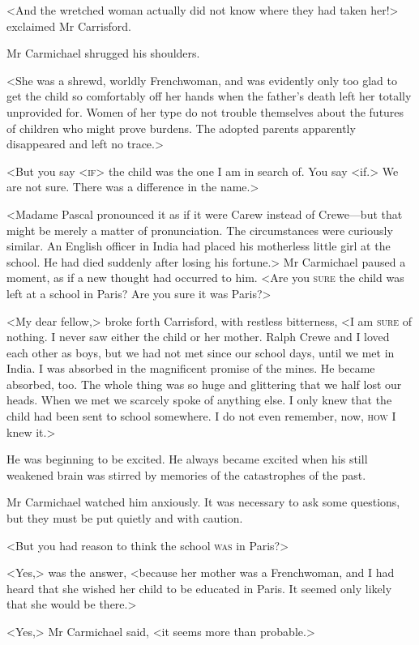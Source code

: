 <And the wretched woman actually did not know where they had taken her!> exclaimed Mr Carrisford.

Mr Carmichael shrugged his shoulders.

<She was a shrewd, worldly Frenchwoman, and was evidently only too glad to get the child so comfortably off her hands when the father's death left her totally unprovided for. Women of her type do not trouble themselves about the futures of children who might prove burdens. The adopted parents apparently disappeared and left no trace.>

<But you say <\textsc{if}> the child was the one I am in search of. You say <if.> We are not sure. There was a difference in the name.>

<Madame Pascal pronounced it as if it were Carew instead of Crewe—but that might be merely a matter of pronunciation. The circumstances were curiously similar. An English officer in India had placed his motherless little girl at the school. He had died suddenly after losing his fortune.> Mr Carmichael paused a moment, as if a new thought had occurred to him. <Are you \textsc{sure} the child was left at a school in Paris? Are you sure it was Paris?>

<My dear fellow,> broke forth Carrisford, with restless bitterness, <I am \textsc{sure} of nothing. I never saw either the child or her mother. Ralph Crewe and I loved each other as boys, but we had not met since our school days, until we met in India. I was absorbed in the magnificent promise of the mines. He became absorbed, too. The whole thing was so huge and glittering that we half lost our heads. When we met we scarcely spoke of anything else. I only knew that the child had been sent to school somewhere. I do not even remember, now, \textsc{how} I knew it.>

He was beginning to be excited. He always became excited when his still weakened brain was stirred by memories of the catastrophes of the past.

Mr Carmichael watched him anxiously. It was necessary to ask some questions, but they must be put quietly and with caution.

<But you had reason to think the school \textsc{was} in Paris?>

<Yes,> was the answer, <because her mother was a Frenchwoman, and I had heard that she wished her child to be educated in Paris. It seemed only likely that she would be there.>

<Yes,> Mr Carmichael said, <it seems more than probable.>

